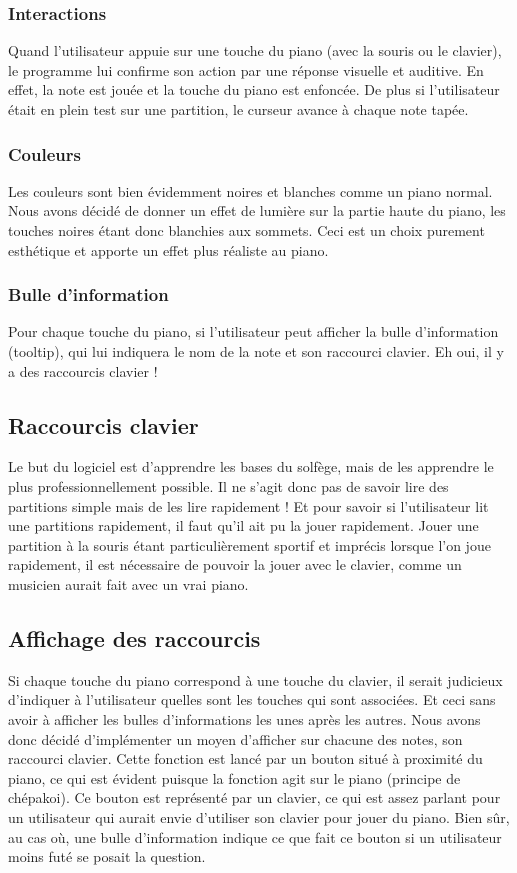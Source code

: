 \documentclass{article}
\begin{document}
\subsubsection{Interactions}
Quand l'utilisateur appuie sur une touche du piano (avec la souris ou le clavier),
le programme lui confirme son action par une réponse visuelle et auditive.
En effet, la note est jouée et la touche du piano est enfoncée. De plus si l'utilisateur était en plein test sur une partition,
le curseur avance à chaque note tapée.
\subsubsection{Couleurs}
Les couleurs sont bien évidemment noires et blanches comme un piano normal. Nous avons décidé de donner un effet de lumière 
sur la partie haute du piano, les touches noires étant donc blanchies aux sommets. Ceci est un choix purement esthétique et 
apporte un effet plus réaliste au piano.
\subsubsection{Bulle d'information}
Pour chaque touche du piano, si l'utilisateur peut afficher la bulle d'information (tooltip), qui lui indiquera le nom de la 
note et son raccourci clavier. Eh oui, il y a des raccourcis clavier !
\subsection{Raccourcis clavier}
Le but du logiciel est d'apprendre les bases du solfège, mais de les apprendre le plus professionnellement possible.
Il ne s’agit donc pas de savoir lire des partitions simple mais de les lire rapidement !
Et pour savoir si l'utilisateur lit une partitions rapidement, il faut qu'il ait pu la jouer rapidement.
Jouer une partition à la souris étant particulièrement sportif et imprécis lorsque l'on joue rapidement, il est nécessaire
de pouvoir la jouer avec le clavier, comme un musicien aurait fait avec un vrai piano.
\subsection{Affichage des raccourcis}
Si chaque touche du piano correspond à une touche du clavier, il serait judicieux d'indiquer à l'utilisateur quelles sont les touches
qui sont associées. Et ceci sans avoir à afficher les bulles d'informations les unes après les autres. Nous avons donc décidé d'implémenter
un moyen d'afficher sur chacune des notes, son raccourci clavier. Cette fonction est lancé par un bouton situé à proximité du piano, ce qui
est évident puisque la fonction agit sur le piano (principe de chépakoi).
Ce bouton est représenté par un clavier, ce qui est assez parlant pour un utilisateur qui aurait envie d'utiliser son clavier 
pour jouer du piano.
Bien sûr, au cas où, une bulle d'information indique ce que fait ce bouton si un utilisateur moins futé se posait la question.
\end{document}
